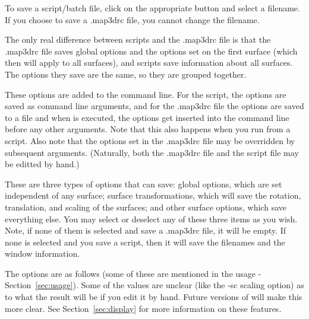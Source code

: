To save a script/batch file, click on the appropriate button and select a
filename.  If you choose to save a .map3drc file, you cannot change the
filename.

The only real difference between scripts and the .map3drc file is that the
.map3drc file saves global options and the options set on the first surface
(which then will apply to all surfaces), and scripts save information about
all surfaces.  The options they save are the same, so they are grouped
together.

These options are added to the command line.  For the script, the options
are saved as command line arguments, and for the .map3drc file the options
are saved to a file and when \map{} is executed, the options get inserted
into the command line before any other arguments.  Note that this also
happens when you run \map{} from a script.  Also note that the options set
in the .map3drc file may be overridden by subsequent arguments.
(Naturally, both the .map3drc file and the script file may be editted by
hand.)

These are three types of options that \map{} can save: global options,
which are set independent of any surface; surface transformations, which
will save the rotation, translation, and scaling of the surfaces; and other
surface options, which save everything else.  You may select or deselect
any of these three items as you wish.  Note, if none of them is selected
and save a .map3drc file, it will be empty.  If none is selected and you
save a script, then it will save the filenames and the window information.

The options are as follows (some of these are mentioned in the usage -
Section~\ref{sec:usage}).  Some of the values are unclear (like the -sc
scaling option) as to what the result will be if you edit it by hand.
Future versions of \map{} will make this more clear.  See
Section~\ref{sec:display} for more information on these features.

